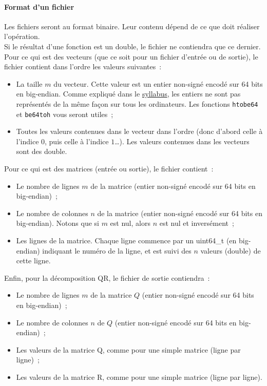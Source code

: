 \documentclass[a4paper, 12pt]{article}
\begin{document}
\paragraph{Format d'un fichier}
Les fichiers seront au format binaire. Leur contenu dépend de ce que doit réaliser l'opération.\\
Si le résultat d'une fonction est un double, le fichier ne contiendra que ce dernier.\\
Pour ce qui est des vecteurs (que ce soit pour un fichier d'entrée ou de sortie), le fichier contient dans l'ordre les valeurs suivantes~:
\begin{itemize}
    \item La taille $m$ du vecteur. Cette valeur est un entier non-signé encodé sur 64 bits en big-endian. Comme expliqué dans le \href{https://sites.uclouvain.be/SyllabusC/notes/Theorie/Fichiers/fichiers.html\#utilisation-des-fichiers}{syllabus}, les entiers ne sont pas représentés de la même façon sur tous les ordinateurs. Les fonctions \texttt{htobe64} et \texttt{be64toh} vous seront utiles~;
    \item Toutes les valeurs contenues dans le vecteur dans l'ordre (donc d'abord celle à l'indice $0$, puis celle à l'indice $1$\dots). Les valeurs contenues dans les vecteurs sont des double.
\end{itemize}
Pour ce qui est des matrices (entrée ou sortie), le fichier contient~:
\begin{itemize}
    \item Le nombre de lignes $m$ de la matrice (entier non-signé encodé sur 64 bits en big-endian)~;
    \item Le nombre de colonnes $n$ de la matrice (entier non-signé encodé sur 64 bits en big-endian). Notons que si $m$ est nul, alors $n$ est nul et inversément~;
    \item Les lignes de la matrice. Chaque ligne commence par un uint64\_t (en big-endian) indiquant le numéro de la ligne, et est suivi des $n$ valeurs (double) de cette ligne.
\end{itemize}
Enfin, pour la décomposition QR, le fichier de sortie contiendra~:
\begin{itemize}
    \item Le nombre de lignes $m$ de la matrice $Q$ (entier non-signé encodé sur 64 bits en big-endian)~;
    \item Le nombre de colonnes $n$ de $Q$ (entier non-signé encodé sur 64 bits en big-endian)~;
    \item Les valeurs de la matrice Q, comme pour une simple matrice (ligne par ligne)~;
    \item Les valeurs de la matrice R, comme pour une simple matrice (ligne par ligne).
\end{itemize}
\end{document}
